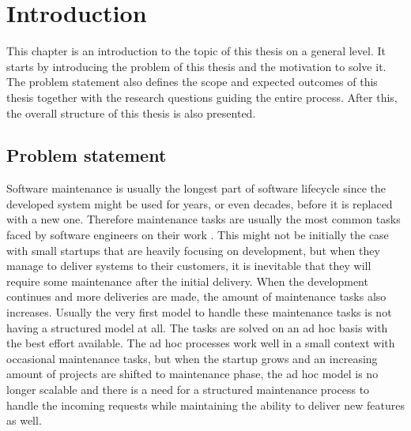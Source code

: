 \chapter{Introduction}
\label{chapter:intro}

This chapter is an introduction to the topic of this thesis on a general level. It starts by introducing the problem of this thesis and the motivation to solve it. The problem statement also
defines the scope and expected outcomes of this thesis together with the research questions guiding the entire process. After this, the overall structure of this thesis is also presented.

\section{Problem statement}

Software maintenance is usually the longest part of software lifecycle since the developed system might be used for years, or even decades, before it is replaced with a new one. Therefore maintenance
tasks are usually the most common tasks faced by software engineers on their work \citep{Sommerville2011}. This might not be initially the case with small startups that are heavily focusing on development,
but when they manage to deliver systems to their customers, it is inevitable that they will require some maintenance after the initial delivery. When the development continues and more deliveries are
made, the amount of maintenance tasks also increases. Usually the very first model to handle these maintenance tasks is not having a structured model at all. The tasks are solved on an ad hoc basis with
the best effort available. The ad hoc processes work well in a small context with occasional maintenance tasks, but when the startup grows and an increasing amount of projects are shifted to maintenance phase, the ad hoc
model is no longer scalable and there is a need for a structured maintenance process to handle the incoming requests while maintaining the ability to deliver new features as well.

